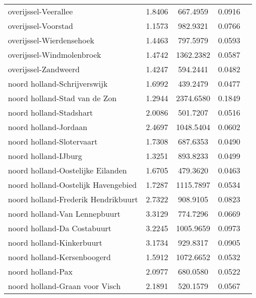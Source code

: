 \begin{longtable}{llccc}
	overijssel-Veerallee                      & 1.8406  & 667.4959  & 0.0916                 \\
	overijssel-Voorstad                       & 1.1573  & 982.9321  & 0.0766                 \\
	overijssel-Wierdensehoek                  & 1.4463  & 797.5979  & 0.0593                 \\
	overijssel-Windmolenbroek                 & 1.4742  & 1362.2382 & 0.0587                 \\
	overijssel-Zandweerd                      & 1.4247  & 594.2441  & 0.0482                 \\
	noord holland-Schrijverswijk              & 1.6992  & 439.2479  & 0.0477                 \\
	noord holland-Stad van de Zon             & 1.2944  & 2374.6580 & 0.1849                 \\
	noord holland-Stadshart                   & 2.0086  & 501.7207  & 0.0516                 \\
	noord holland-Jordaan                     & 2.4697  & 1048.5404 & 0.0602                 \\
	noord holland-Slotervaart                 & 1.7308  & 687.6353  & 0.0490                 \\
	noord holland-IJburg                      & 1.3251  & 893.8233  & 0.0499                 \\
	noord holland-Oostelijke Eilanden         & 1.6705  & 479.3620  & 0.0463                 \\
	noord holland-Oostelijk Havengebied       & 1.7287  & 1115.7897 & 0.0534                 \\
	noord holland-Frederik Hendrikbuurt       & 2.7322  & 908.9105  & 0.0823                 \\
	noord holland-Van Lennepbuurt             & 3.3129  & 774.7296  & 0.0669                 \\
	noord holland-Da Costabuurt               & 3.2245  & 1005.9659 & 0.0973                 \\
	noord holland-Kinkerbuurt                 & 3.1734  & 929.8317  & 0.0905                 \\
	noord holland-Kersenboogerd               & 1.5912  & 1072.6652 & 0.0532                 \\
	noord holland-Pax                         & 2.0977  & 680.0580  & 0.0522                 \\
	noord holland-Graan voor Visch            & 2.1891  & 520.1579  & 0.0567                 \\

\end{longtable}
